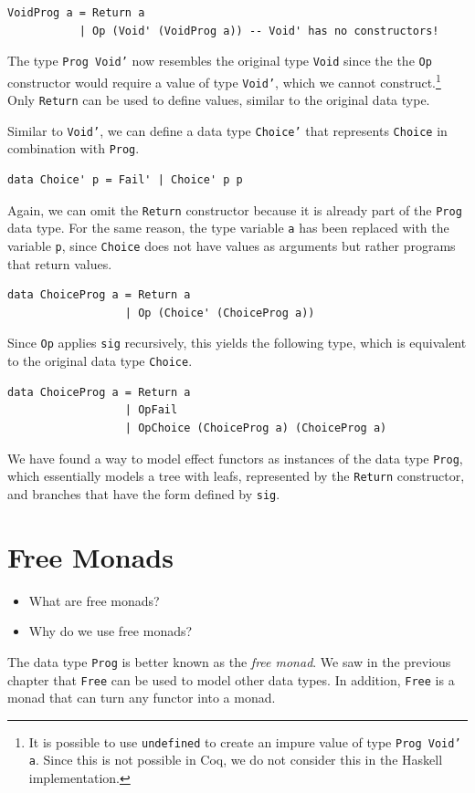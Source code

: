 \documentclass[a4paper, 11pt, fleqn, twoside]{scrreprt}
\newcommand{\todo}[1]{\marginpar{\textbf{TODO:} #1}}
\newcommand{\hinl}[1]{\texttt{#1}}
\begin{document}
\begin{verbatim}
VoidProg a = Return a
           | Op (Void' (VoidProg a)) -- Void' has no constructors!
\end{verbatim}

The type \hinl{Prog Void'} now resembles the original type 
\hinl{Void} since the the \hinl{Op} constructor 
would require a value of type \hinl{Void'}, which we cannot 
construct.\footnote{It is possible to use \hinl{undefined} to 
create an impure value of type \hinl{Prog Void' a}. Since this 
is not possible in Coq, we do not consider this in the Haskell implementation.}
Only \hinl{Return} can be used to define values, similar to the 
original data type.

Similar to \hinl{Void'}, we can define a data type 
\hinl{Choice'} that represents \hinl{Choice} in 
combination with \hinl{Prog}. 

\begin{verbatim}
data Choice' p = Fail' | Choice' p p
\end{verbatim}

Again, we can omit the \hinl{Return} constructor because it is 
already part of the \hinl{Prog} data type. For the same reason, 
the type variable \hinl{a} has been replaced with the variable 
\hinl{p}, since \hinl{Choice} does not have 
values as arguments but rather programs that return values.

\begin{verbatim}
data ChoiceProg a = Return a
                  | Op (Choice' (ChoiceProg a))
\end{verbatim}

Since \hinl{Op} applies \hinl{sig} recursively, 
this yields the following type, which is equivalent to the original data type 
\hinl{Choice}.

\begin{verbatim}
data ChoiceProg a = Return a
                  | OpFail
                  | OpChoice (ChoiceProg a) (ChoiceProg a)
\end{verbatim}

We have found a way to model effect functors as instances of the data type 
\hinl{Prog}, which essentially models a tree with leafs, 
represented by the \hinl{Return} constructor, and branches that 
have the form defined by \hinl{sig}. \todo{Tree structure 
visualization?}

\section{Free Monads}
\begin{itemize}
\item What are free monads?
\item Why do we use free monads?
\end{itemize}
The data type \hinl{Prog} is better known as the \textit{free 
monad}. We saw in the previous chapter that \hinl{Free} can be 
used to model other data types. In addition, \hinl{Free} is a 
monad that can turn any functor into a monad.
\end{document}
